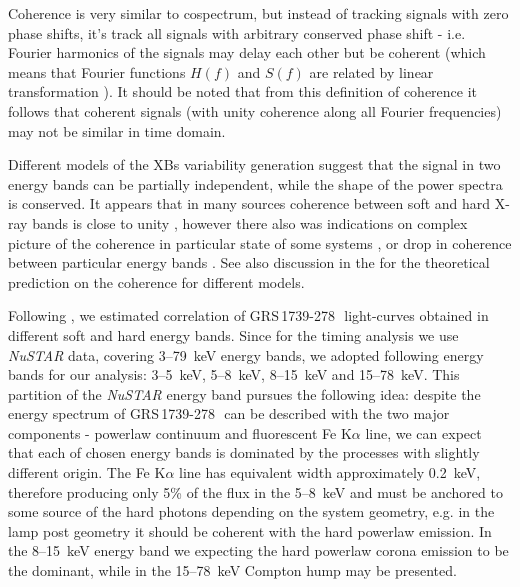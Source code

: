 \documentclass[a4paper,fleqn,usenatbib]{mnras}
\def\grs{{GRS\,1739-278\,}}
\begin{document}
Coherence is very similar to cospectrum, but instead of tracking signals with zero phase shifts, it's track all signals with arbitrary conserved phase shift - i.e. Fourier harmonics of the signals may delay each other but be coherent (which means that Fourier functions $H(f)$ and $S(f)$ are related by linear transformation \citep{1997ApJ...474L..43V}).
It should be noted that from this definition of coherence it follows that coherent signals (with unity coherence along all Fourier frequencies) may not be similar in time domain. 

Different models of the XBs variability generation suggest that the signal in two energy bands can be partially independent, while the shape of the power spectra is conserved.
It appears that in many sources coherence between soft and hard X-ray bands is close to unity \citep{1999ApJ...517..355N, 1999ApJ...514..939W}, however there also was indications on complex picture of the coherence in particular state of some systems \citep{2003ApJ...584L..23J}, or drop in coherence between particular energy bands \citep[e.g. in GX 339--4][]{1997ApJ...474L..43V}.
See also discussion in the \citep{1997ApJ...474L..43V} for the theoretical prediction on the coherence for different models.


Following \citep{1997ApJ...474L..43V}, we estimated correlation of \grs\ light-curves obtained in different soft and hard energy bands. 
Since for the timing analysis we use {\it NuSTAR} data, covering 3--79~keV energy bands, we adopted following energy bands for our analysis: 3--5~keV, 5--8~keV, 8--15~keV and 15--78~keV.
This partition of the {\it NuSTAR} energy band pursues the following idea: despite the energy spectrum of \grs\ can be described with the two major components - powerlaw continuum and fluorescent Fe K$\alpha$ line, we can expect that each of chosen energy bands is dominated by the processes with slightly different origin. 
The Fe K$\alpha$ line has equivalent width approximately 0.2~keV, therefore producing only 5\% of the flux in the 5--8~keV and must be anchored to some source of the hard photons depending on the system geometry, e.g. in the lamp post geometry it should be coherent with the hard powerlaw emission. 
In the 8--15~keV energy band we expecting the hard powerlaw corona emission to be the dominant, while in the 15--78~keV Compton hump may be presented.
\end{document}
